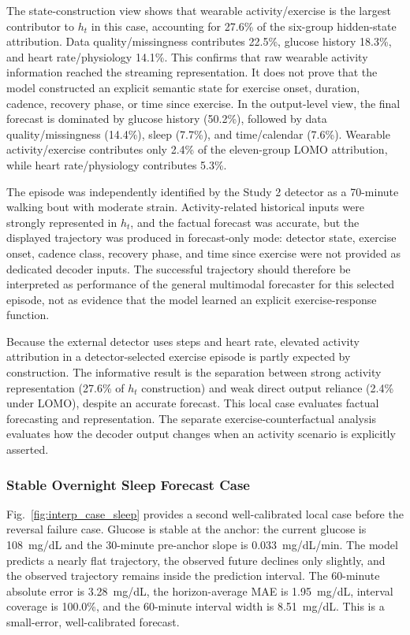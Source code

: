 The state-construction view shows that wearable activity/exercise is the
largest contributor to $h_t$ in this case, accounting for 27.6\% of the
six-group hidden-state attribution. Data quality/missingness contributes
22.5\%, glucose history 18.3\%, and heart rate/physiology 14.1\%. This confirms
that raw wearable activity information reached the streaming representation.
It does not prove that the model constructed an explicit semantic state for
exercise onset, duration, cadence, recovery phase, or time since exercise. In
the output-level view, the final forecast is dominated by glucose history
(50.2\%), followed by data quality/missingness (14.4\%), sleep (7.7\%), and
time/calendar (7.6\%). Wearable activity/exercise contributes only 2.4\% of
the eleven-group LOMO attribution, while heart rate/physiology contributes
5.3\%.

The episode was independently identified by the Study 2 detector as a
70-minute walking bout with moderate strain. Activity-related historical inputs
were strongly represented in $h_t$, and the factual forecast was accurate, but
the displayed trajectory was produced in forecast-only mode: detector state,
exercise onset, cadence class, recovery phase, and time since exercise were not
provided as dedicated decoder inputs. The successful trajectory should
therefore be interpreted as performance of the general multimodal forecaster
for this selected episode, not as evidence that the model learned an explicit
exercise-response function.

Because the external detector uses steps and heart rate, elevated activity
attribution in a detector-selected exercise episode is partly expected by
construction. The informative result is the separation between strong activity
representation (27.6\% of $h_t$ construction) and weak direct output reliance
(2.4\% under LOMO), despite an accurate forecast. This local case evaluates
factual forecasting and representation. The separate exercise-counterfactual
analysis evaluates how the decoder output changes when an activity scenario is
explicitly asserted.

\subsubsection{Stable Overnight Sleep Forecast Case}
\label{subsec:interp_case_sleep}

Fig.~\ref{fig:interp_case_sleep} provides a second well-calibrated local case
before the reversal failure case. Glucose is stable at the anchor: the current glucose is
108~mg/dL and the 30-minute pre-anchor slope is 0.033~mg/dL/min. The model
predicts a nearly flat trajectory, the observed future declines only slightly,
and the observed trajectory remains inside the prediction interval. The
60-minute absolute error is 3.28~mg/dL, the horizon-average MAE is
1.95~mg/dL, interval coverage is 100.0\%, and the 60-minute interval width is
8.51~mg/dL. This is a small-error, well-calibrated forecast.

